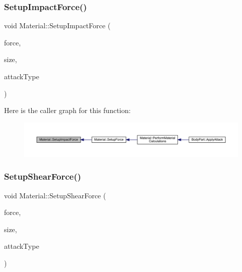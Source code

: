 \subsubsection{\texorpdfstring{Setup\+Impact\+Force()}{SetupImpactForce()}}
{\footnotesize\ttfamily void Material\+::\+Setup\+Impact\+Force (\begin{DoxyParamCaption}\item[{float}]{force,  }\item[{float}]{size,  }\item[{\mbox{\hyperlink{_enum_types_8hpp_a904b2f9c8f3951116c343784c59d6afe}{Attack\+Type}}}]{attack\+Type }\end{DoxyParamCaption})\hspace{0.3cm}{\ttfamily [private]}}

Here is the caller graph for this function\+:
\nopagebreak
\begin{figure}[H]
\begin{center}
\leavevmode
\includegraphics[width=350pt]{class_material_a0306582d701642b867f9c53c769ffaf7_icgraph}
\end{center}
\end{figure}
\mbox{\label{class_material_a65d6bf35a560e97da3468e91178facdc}} 
\subsubsection{\texorpdfstring{Setup\+Shear\+Force()}{SetupShearForce()}}
{\footnotesize\ttfamily void Material\+::\+Setup\+Shear\+Force (\begin{DoxyParamCaption}\item[{float}]{force,  }\item[{float}]{size,  }\item[{\mbox{\hyperlink{_enum_types_8hpp_a904b2f9c8f3951116c343784c59d6afe}{Attack\+Type}}}]{attack\+Type }\end{DoxyParamCaption})\hspace{0.3cm}{\ttfamily [private]}}


